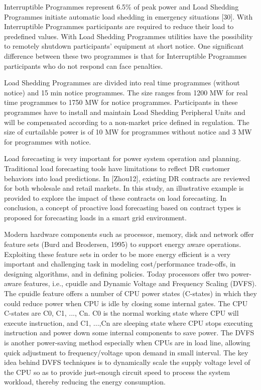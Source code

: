 \documentclass{llncs}
\begin{document}
Interruptible Programmes represent 6.5{\%} of peak power and Load Shedding
Programmes initiate automatic load shedding in emergency situations [30].
With Interruptible Programmes participants are required to reduce their load
to predefined values. With Load Shedding Programmes utilities have the
possibility to remotely shutdown participants' equipment at short notice.
One significant difference between these two programmes is that for
Interruptible Programmes participants who do not respond can face penalties.

Load Shedding Programmes are divided into real time programmes (without
notice) and 15 min notice programmes. The size ranges from 1200 MW for real
time programmes to 1750 MW for notice programmes. Participants in these
programmes have to install and maintain Load Shedding Peripheral Units and
will be compensated according to a non-market price defined in regulation.
The size of curtailable power is of 10 MW for programmes without notice and
3 MW for programmes with notice.

Load forecasting is very important for power system operation and planning.
Traditional load forecasting tools have limitations to reflect DR customer
behaviors into load predictions. In [Zhou12], existing DR contracts are
reviewed for both wholesale and retail markets. In this study, an
illustrative example is provided to explore the impact of these contracts on
load forecasting. In conclusion, a concept of proactive load forecasting
based on contract types is proposed for forecasting loads in a smart grid
environment.

Modern hardware components such as processor, memory, disk and network offer
feature sets (Burd and Brodersen, 1995) to support energy aware operations.
Exploiting these feature sets in order to be more energy efficient is a very
important and challenging task in modeling cost/performance trade-offs, in
designing algorithms, and in defining policies. Today processors offer two
power-aware features, i.e., cpuidle and Dynamic Voltage and Frequency
Scaling (DVFS). The cpuidle feature offers a number of CPU power states
(C-states) in which they could reduce power when CPU is idle by closing some
internal gates. The CPU C-states are C0, C1, ..., Cn. C0 is the normal
working state where CPU will execute instruction, and C1, ...,Cn are
sleeping state where CPU stops executing instruction and power down some
internal components to save power. The DVFS is another power-saving method
especially when CPUs are in load line, allowing quick adjustment to
frequency/voltage upon demand in small interval. The key idea behind DVFS
techniques is to dynamically scale the supply voltage level of the CPU so as
to provide just-enough circuit speed to process the system workload, thereby
reducing the energy consumption.
\end{document}
